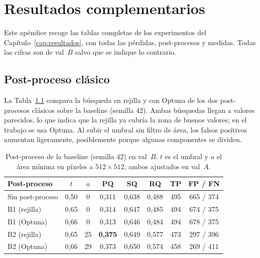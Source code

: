 
\chapter{Resultados complementarios}
\label{ap:resultados}

Este apéndice recoge las tablas completas de los experimentos del
Capítulo~\ref{cap:resultados}, con todas las pérdidas, post-procesos y
medidas. Todas las cifras son de val~$B$ salvo que se indique lo
contrario.

\section{Post-proceso clásico}
\label{sec:anx-post}

La Tabla~\ref{tab:anx-post} compara la búsqueda en rejilla y con Optuna
de los dos post-procesos clásicos sobre la baseline (semilla 42). Ambas
búsquedas llegan a valores parecidos, lo que indica que la rejilla ya
cubría la zona de buenos valores; en el trabajo se usa Optuna. Al subir
el umbral sin filtro de área, los falsos positivos aumentan
ligeramente, posiblemente porque algunas componentes se dividen.

\begin{table}[htbp]
\centering
\small
\begin{tabular}{@{}lccccccc@{}}
\toprule
Post-proceso & $t$ & $a$ & PQ & SQ & RQ & TP & FP / FN\\
\midrule
Sin post-proceso & 0,50 & 0 & 0,311 & 0,638 & 0,488 & 495 & 665 / 374\\
B1 (rejilla) & 0,65 & 0 & 0,314 & 0,647 & 0,485 & 494 & 674 / 375\\
B1 (Optuna) & 0,66 & 0 & 0,313 & 0,646 & 0,484 & 494 & 678 / 375\\
B2 (rejilla) & 0,65 & 25 & \textbf{0,375} & 0,649 & 0,577 & 473 & 297 / 396\\
B2 (Optuna) & 0,66 & 29 & 0,373 & 0,650 & 0,574 & 458 & 269 / 411\\
\bottomrule
\end{tabular}
\caption{Post-proceso de la baseline (semilla 42) en val~$B$. $t$ es el
umbral y $a$ el área mínima en píxeles a $512\times512$, ambos ajustados
en val~$A$.}
\label{tab:anx-post}
\end{table}

